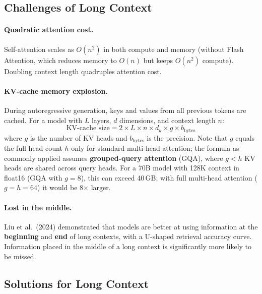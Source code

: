 \subsection{Challenges of Long Context}

\paragraph{Quadratic attention cost.}
Self-attention scales as $O(n^2)$ in both compute and memory (without Flash
Attention, which reduces memory to $O(n)$ but keeps $O(n^2)$ compute).
Doubling context length quadruples attention cost.

\paragraph{KV-cache memory explosion.}
During autoregressive generation, keys and values from all previous tokens
are cached.  For a model with $L$ layers, $d$ dimensions, and context
length $n$:
\begin{equation}
\text{KV-cache size} = 2 \times L \times n \times d_k \times g \times b_{\text{bytes}}
\label{eq:kv_cache}
\end{equation}
where $g$ is the number of KV heads and $b_{\text{bytes}}$ is the precision.
Note that $g$ equals the full head count $h$ only for standard multi-head
attention; the formula as commonly applied assumes \textbf{grouped-query
attention} (GQA), where $g < h$ KV heads are shared across query heads.
For a 70B model with 128K context in float16 (GQA with $g = 8$), this can
exceed 40\,GB; with full multi-head attention ($g = h = 64$) it would be
8$\times$ larger.

\paragraph{Lost in the middle.}
Liu et al.\ (2024) demonstrated that models are better at using information
at the \textbf{beginning} and \textbf{end} of long contexts, with a U-shaped
retrieval accuracy curve.  Information placed in the middle of a long context
is significantly more likely to be missed.

\subsection{Solutions for Long Context}

